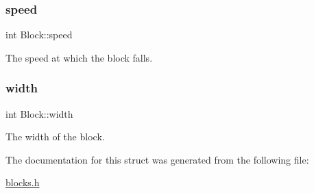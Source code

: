 \mbox{\label{structBlock_a2d831bc3c75fd862c47c40200e05c662}} 
\subsubsection{\texorpdfstring{speed}{speed}}
{\footnotesize\ttfamily int Block\+::speed}



The speed at which the block falls. 

\mbox{\label{structBlock_a867e5f837601e459d9831e3cfb4f4738}} 
\subsubsection{\texorpdfstring{width}{width}}
{\footnotesize\ttfamily int Block\+::width}



The width of the block. 



The documentation for this struct was generated from the following file\+:\begin{DoxyCompactItemize}
\item 
\mbox{\hyperlink{blocks_8h}{blocks.\+h}}\end{DoxyCompactItemize}
